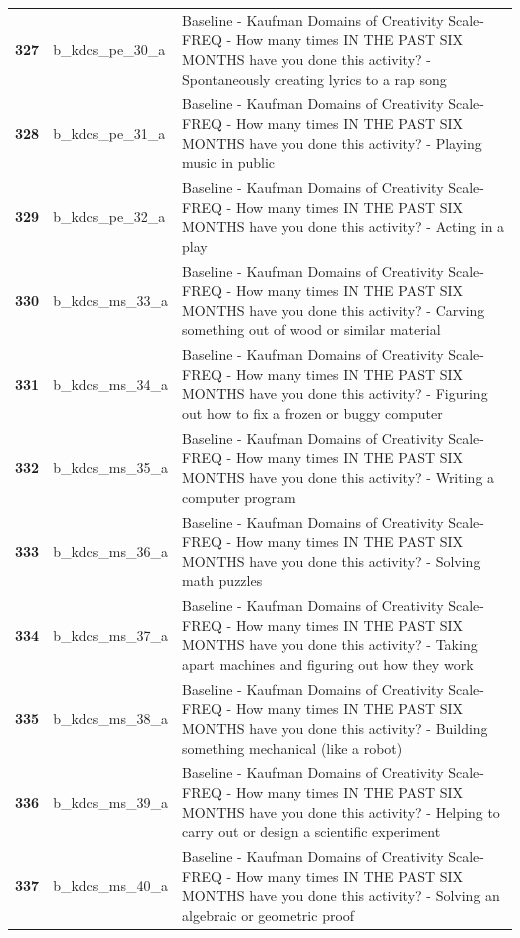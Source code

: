 \documentclass[
  letterpaper,
  DIV=11,
  numbers=noendperiod]{scrartcl}
\begin{document}
\begin{longtable}[t]{>{}cll}
\textbf{327} & b\_kdcs\_pe\_30\_a & Baseline - Kaufman Domains of Creativity Scale-FREQ - How many times IN THE PAST SIX MONTHS have you done this activity? - Spontaneously creating lyrics to a rap song\\
\textbf{328} & b\_kdcs\_pe\_31\_a & Baseline - Kaufman Domains of Creativity Scale-FREQ - How many times IN THE PAST SIX MONTHS have you done this activity? - Playing music in public\\
\textbf{329} & b\_kdcs\_pe\_32\_a & Baseline - Kaufman Domains of Creativity Scale-FREQ - How many times IN THE PAST SIX MONTHS have you done this activity? - Acting in a play\\
\textbf{330} & b\_kdcs\_ms\_33\_a & Baseline - Kaufman Domains of Creativity Scale-FREQ - How many times IN THE PAST SIX MONTHS have you done this activity? - Carving something out of wood or similar material\\
\addlinespace
\textbf{331} & b\_kdcs\_ms\_34\_a & Baseline - Kaufman Domains of Creativity Scale-FREQ - How many times IN THE PAST SIX MONTHS have you done this activity? - Figuring out how to fix a frozen or buggy computer\\
\textbf{332} & b\_kdcs\_ms\_35\_a & Baseline - Kaufman Domains of Creativity Scale-FREQ - How many times IN THE PAST SIX MONTHS have you done this activity? - Writing a computer program\\
\textbf{333} & b\_kdcs\_ms\_36\_a & Baseline - Kaufman Domains of Creativity Scale-FREQ - How many times IN THE PAST SIX MONTHS have you done this activity? - Solving math puzzles\\
\textbf{334} & b\_kdcs\_ms\_37\_a & Baseline - Kaufman Domains of Creativity Scale-FREQ - How many times IN THE PAST SIX MONTHS have you done this activity? - Taking apart machines and figuring out how they work\\
\textbf{335} & b\_kdcs\_ms\_38\_a & Baseline - Kaufman Domains of Creativity Scale-FREQ - How many times IN THE PAST SIX MONTHS have you done this activity? - Building something mechanical (like a robot)\\
\addlinespace
\textbf{336} & b\_kdcs\_ms\_39\_a & Baseline - Kaufman Domains of Creativity Scale-FREQ - How many times IN THE PAST SIX MONTHS have you done this activity? - Helping to carry out or design a scientific experiment\\
\textbf{337} & b\_kdcs\_ms\_40\_a & Baseline - Kaufman Domains of Creativity Scale-FREQ - How many times IN THE PAST SIX MONTHS have you done this activity? - Solving an algebraic or geometric proof\\

\end{longtable}
\end{document}
